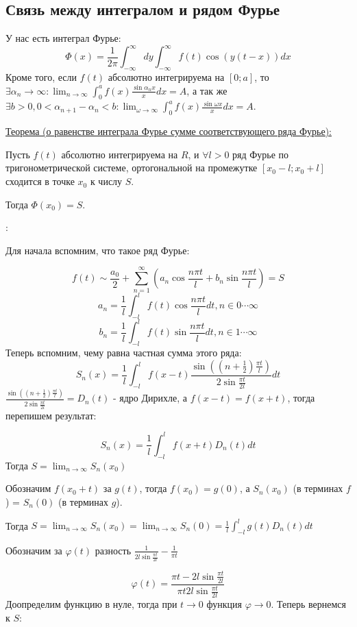 \documentclass[12pt]{article}
\begin{document}
\subsection{Связь между интегралом и рядом Фурье}
У нас есть интеграл Фурье:
$$\Phi (x) = \frac{1}{2\pi} \int_{-\infty}^{\infty} dy \int_{-\infty}^{\infty} f(t) \cos{(y(t-x))} dx$$
Кроме того, если $f(t)$ абсолютно интегрируема на $[0; a]$, то $\exists \alpha_n \to \infty : \lim_{n\to\infty} \int_0^a f(x) \frac{\sin{\alpha_n x}}{x} dx = A$, а так же $\exists b > 0, 0 < \alpha_{n+1} - \alpha_n < b : \lim_{\omega \to \infty} \int_0^a f(x) \frac{\sin{\omega x}}{x} dx = A$.\par
\uline{Теорема (о равенстве интеграла Фурье сумме соответствующего ряда Фурье):}\par
Пусть $f(t)$ абсолютно интегрируема на $R$, и $\forall l > 0$ ряд Фурье по тригонометрической системе, ортогональной на промежутке $[x_0 -l; x_0 + l]$ сходится в точке $x_0$ к числу $S$.\par
Тогда $\Phi (x_0) = S$.\par
{}:\par
Для начала вспомним, что такое ряд Фурье:\par
$$f(t) \sim \frac{a_0}{2} + \sum_{n=1}^{\infty} (a_n \cos{\frac{n\pi t}{l}} + b_n \sin{\frac{n\pi t}{l}}) = S$$
$$a_n = \frac{1}{l} \int_{-l}^{l} f(t) \cos{\frac{n\pi t}{l}} dt, n \in 0 \cdots \infty$$
$$b_n = \frac{1}{l} \int_{-l}^{l} f(t) \sin{\frac{n\pi t}{l}} dt, n \in 1 \cdots \infty$$
Теперь вспомним, чему равна частная сумма этого ряда:
$$S_n(x) = \frac{1}{l} \int_{-l}^{l} f(x-t) \frac{\sin{((n+\frac{1}{2})\frac{\pi t}{l})}}{2\sin{\frac{\pi t}{2 l}}} dt$$
$\frac{\sin{((n+\frac{1}{2})\frac{\pi t}{l})}}{2\sin{\frac{\pi t}{2 l}}} = D_n (t)$ - ядро Дирихле, а $f(x-t) = f(x+t)$, тогда перепишем результат:\par
$$S_n(x) = \frac{1}{l} \int_{-l}^{l} f(x+t) D_n(t) dt$$
Тогда $S = \lim_{n\to\infty} S_n(x_0)$\par
Обозначим $f(x_0+t)$ за $g(t)$, тогда $f(x_0) = g(0)$, а $S_n(x_0)$ (в терминах $f$) = $S_n(0)$ (в терминах $g$).\par
Тогда $S = \lim_{n\to\infty} S_n(x_0) = \lim_{n\to\infty} S_n(0) = \frac{1}{l} \int_{-l}^{l} g(t) D_n(t) dt$\par
Обозначим за $\varphi (t)$ разность $\frac{1}{2l\sin{\frac{\pi t}{2l}}} - \frac{1}{\pi t}$\par
$$\varphi (t) = \frac{\pi t - 2l \sin{\frac{\pi t}{2l}}}{\pi t 2 l\sin{\frac{\pi t}{2l}}}$$
Доопределим функцию в нуле, тогда при $t \to 0$ функция $\varphi \to 0$. Теперь вернемся к $S$:\par
\end{document}
